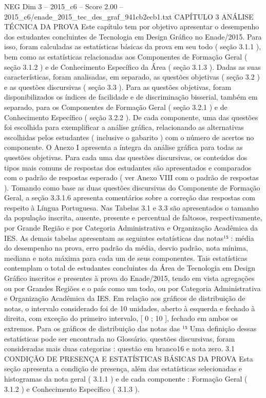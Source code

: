 \begin{textsample}{NEG Dim 3 – 2015\_c6 – Score 2.00 – 2015\_c6/enade\_2015\_tec\_des\_graf\_941cb2ecb1.txt}  \label{ex:f3_neg_072}
CAPÍTULO 3 ANÁLISE TÉCNICA DA PROVA Este capítulo tem por objetivo apresentar o desempenho dos estudantes concluintes de Tecnologia em Design Gráfico no Enade/2015.
Para isso, foram calculadas as estatísticas básicas da prova em seu todo ( seção 3.1.1 ), bem como as estatísticas relacionadas aos Componentes de Formação Geral ( seção 3.1.2 ) e de Conhecimento Específico da Área ( seção 3.1.3 ).
Dadas as suas características, foram analisadas, em separado, as questões objetivas ( seção 3.2 ) e as questões discursivas ( seção 3.3 ).
Para as questões objetivas, foram disponibilizados os índices de facilidade e de discriminação bisserial, também em separado, para os Componentes de Formação Geral ( seção 3.2.1 ) e de Conhecimento Específico ( seção 3.2.2 ).
De cada componente, uma das questões foi escolhida para exemplificar a análise gráfica, relacionando as alternativas escolhidas pelos estudantes ( inclusive o gabarito ) com o número de acertos no componente.
O Anexo I apresenta a íntegra da análise gráfica para todas as questões objetivas.
Para cada uma das questões discursivas, os conteúdos dos tipos mais comuns de respostas dos estudantes são apresentados e comparados com o padrão de respostas esperado ( ver Anexo VIII com o padrão de respostas ).
Tomando como base as duas questões discursivas do Componente de Formação Geral, a seção 3.3.1.6 apresenta comentários sobre a correção das respostas com respeito à Língua Portuguesa.
Nas Tabelas 3.1 e 3.3 são apresentados o tamanho da população inscrita, ausente, presente e percentual de faltosos, respectivamente, por Grande Região e por Categoria Administrativa e Organização Acadêmica da IES.
As demais tabelas apresentam as seguintes estatísticas das notas¹⁵ : média do desempenho na prova, erro padrão da média, desvio padrão, nota mínima, mediana e nota máxima para cada um de seus componentes.
Tais estatísticas contemplam o total de estudantes concluintes da Área de Tecnologia em Design Gráfico inscritos e presentes à prova do Enade/2015, tendo em vista agregações ou por Grandes Regiões e o país como um todo, ou por Categoria Administrativa e Organização Acadêmica da IES.
Em relação aos gráficos de distribuição de notas, o intervalo considerado foi de 10 unidades, aberto à esquerda e fechado à direita, com exceção do primeiro intervalo, [ 0 ; 10 ], fechado em ambos os extremos.
Para os gráficos de distribuição das notas das ¹⁵ Uma definição dessas estatísticas pode ser encontrada no Glossário. questões discursivas, foram consideradas mais duas categorias : questão em branco16 e nota zero. 3.1 CONDIÇÃO DE PRESENÇA E ESTATÍSTICAS BÁSICAS DA PROVA Esta seção apresenta a condição de presença, além das estatísticas selecionadas e histogramas da nota geral ( 3.1.1 ) e de cada componente : Formação Geral ( 3.1.2 ) e Conhecimento Específico ( 3.1.3 ).

\end{textsample}
